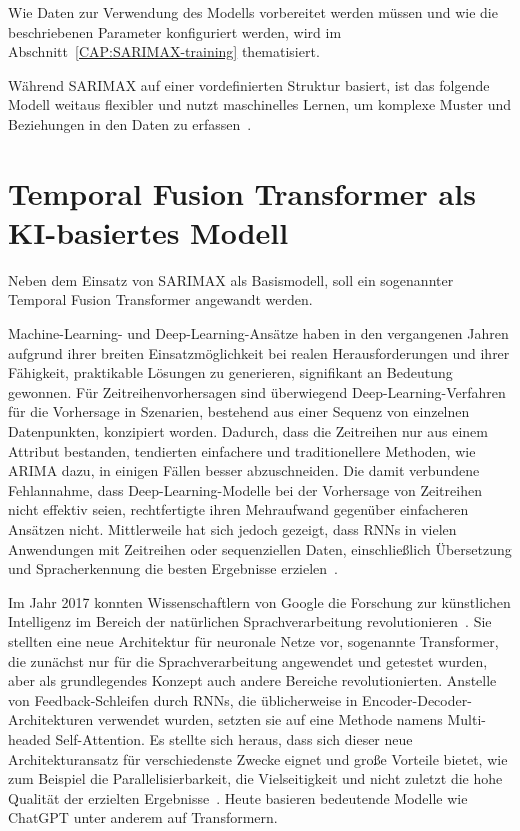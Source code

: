 Wie Daten zur Verwendung des Modells vorbereitet werden müssen und wie die beschriebenen Parameter konfiguriert werden, wird im Abschnitt~\ref{CAP:SARIMAX-training} thematisiert.

Während \ac{SARIMAX} auf einer vordefinierten Struktur basiert, ist das folgende Modell weitaus flexibler und nutzt maschinelles Lernen, um komplexe Muster und Beziehungen in den Daten zu erfassen~\cite{Lim.19.12.2019}.

\section{Temporal Fusion Transformer als KI-basiertes Modell}
Neben dem Einsatz von SARIMAX als Basismodell, soll ein sogenannter Temporal Fusion Transformer angewandt werden.

Machine-Learning- und Deep-Learning-Ansätze haben in den vergangenen Jahren aufgrund ihrer breiten Einsatzmöglichkeit bei realen Herausforderungen und ihrer Fähigkeit, praktikable Lösungen zu generieren, signifikant an Bedeutung gewonnen.
Für Zeitreihenvorhersagen sind überwiegend Deep-Learning-Verfahren für die Vorhersage in Szenarien, bestehend aus einer Sequenz von einzelnen Datenpunkten, konzipiert worden.
Dadurch, dass die Zeitreihen nur aus einem Attribut bestanden, tendierten einfachere und traditionellere Methoden, wie \ac{ARIMA} dazu, in einigen Fällen besser abzuschneiden.
Die damit verbundene Fehlannahme, dass Deep-Learning-Modelle bei der Vorhersage von Zeitreihen nicht effektiv seien, rechtfertigte ihren Mehraufwand gegenüber einfacheren Ansätzen nicht.
Mittlerweile hat sich jedoch gezeigt, dass \acp{RNN} in vielen Anwendungen mit Zeitreihen oder sequenziellen Daten, einschließlich Übersetzung und Spracherkennung die besten Ergebnisse erzielen~\cite{Lazzeri.2021}.

Im Jahr 2017 konnten Wissenschaftlern von Google die Forschung zur künstlichen Intelligenz im Bereich der natürlichen Sprachverarbeitung revolutionieren~\cite{Vaswani.2017}.
Sie stellten eine neue Architektur für neuronale Netze vor, sogenannte Transformer, die zunächst nur für die Sprachverarbeitung angewendet und getestet wurden, aber als grundlegendes Konzept auch andere Bereiche revolutionierten.
Anstelle von Feedback-Schleifen durch \acp{RNN}, die üblicherweise in Encoder-Decoder-Architekturen verwendet wurden, setzten sie auf eine Methode namens \glqq Multi-headed Self-Attention\grqq{}.
Es stellte sich heraus, dass sich dieser neue Architekturansatz für verschiedenste Zwecke eignet und große Vorteile bietet, wie zum Beispiel die Parallelisierbarkeit, die Vielseitigkeit und nicht zuletzt die hohe Qualität der erzielten Ergebnisse~\cite{Vaswani.2017}.
Heute basieren bedeutende Modelle wie ChatGPT unter anderem auf Transformern.

